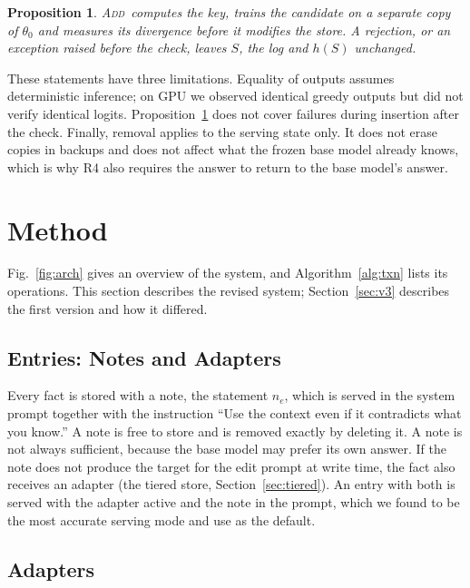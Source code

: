 \documentclass[journal,10pt]{IEEEtran}
\newtheorem{proposition}{Proposition}
\newcommand{\commit}{\textsc{Add}}
\begin{document}
\begin{proposition}\label{prop:atomic}
\commit\ computes the key, trains the candidate on a separate copy of $\theta_0$ and
measures its divergence before it modifies the store. A rejection, or an exception
raised before the check, leaves $S$, the log and $h(S)$ unchanged.
\end{proposition}

These statements have three limitations. Equality of outputs assumes deterministic
inference; on GPU we observed identical greedy outputs but did not verify identical
logits. Proposition~\ref{prop:atomic} does not cover failures during insertion after
the check. Finally, removal applies to the serving state only. It does not erase copies
in backups and does not affect what the frozen base model already knows, which is why
R4 also requires the answer to return to the base model's answer.

\section{Method}
\label{sec:method}



Fig.~\ref{fig:arch} gives an overview of the system, and Algorithm~\ref{alg:txn} lists
its operations. This section describes the revised system; Section~\ref{sec:v3}
describes the first version and how it differed.

\subsection{Entries: Notes and Adapters}

Every fact is stored with a note, the statement $n_e$, which is served in the system
prompt together with the instruction ``Use the context even if it contradicts what you
know.'' A note is free to store and is removed exactly by deleting it. A note is not
always sufficient, because the base model may prefer its own answer. If the note does
not produce the target for the edit prompt at write time, the fact also receives an
adapter (the tiered store, Section~\ref{sec:tiered}). An entry with both is served with
the adapter active and the note in the prompt, which we found to be the most accurate
serving mode and use as the default.

\subsection{Adapters}
\end{document}
